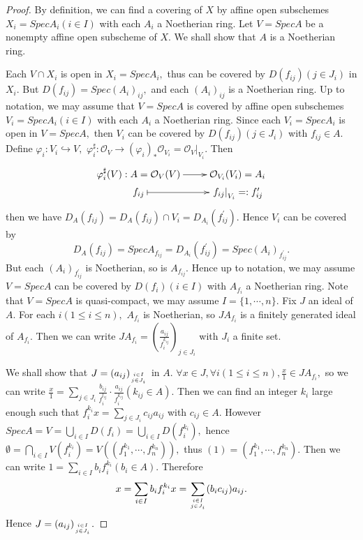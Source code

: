 \begin{proof}
By definition, we can find a covering of $X$ by affine open
subschemes $X_i=SpecA_i(i\in I)$ with each $A_i$ a Noetherian ring.
Let $V=SpecA$ be a nonempty affine open subscheme of $X.$ We shall
show that $A$ is a Noetherian ring.

Each $V\cap X_i$ is open in $X_i=SpecA_i,$ thus can be covered by
$D(f_{ij})(j\in J_i)$ in $X_i.$ But $D(f_{ij})=Spec(A_i)_{ij},$ and
each $(A_i)_{ij}$ is a Noetherian ring. Up to notation, we may
assume that $V=SpecA$ is covered by affine open subschemes
$V_i=SpecA_i(i\in I)$ with each $A_i$ a Noetherian ring. Since each
$V_i=SpecA_i$ is open in $V=SpecA,$ then $V_i$ can be covered by
$D(f_{ij})(j\in J_i)$ with $f_{ij}\in A.$ Define $\varphi_i:
V_i\hookrightarrow V,$ $\varphi_i^{\sharp}:\mathcal {O}_V\rightarrow
(\varphi_i)_{\ast}\mathcal {O}_{V_i}=\left.\mathcal
{O}_V\right|_{V_i}.$ Then
\[ \xymatrix@R=0em{
   {\varphi_i^{\sharp}(V):A=\mathcal {O}_V(V)} \ar[r] & {\mathcal
   {O}_{V_i}(V_i)=A_i}                                            \\
   f_{ij} \ar@{|->}[r] & {\left.f_{ij}\right|_{V_i}=:f_{ij}^{\prime}} }  \]
then we have $D_A(f_{ij})=D_A(f_{ij})\cap
V_i=D_{A_i}(f_{ij}^{\prime}).$ Hence $V_i$ can be covered by
$$D_A(f_{ij})=SpecA_{f_{ij}}=D_{A_i}(f_{ij}^{\prime})=Spec(A_i)_{f_{ij}^{\prime}}.$$
But each $(A_i)_{f_{ij}^{\prime}}$ is Noetherian, so is
$A_{f_{ij}}.$ Hence up to notation, we may assume $V=SpecA$ can be
covered by $D(f_i)(i\in I)$ with $A_{f_i}$ a Noetherian ring. Note
that $V=SpecA$ is quasi-compact, we may assume $I=\{1,\cdots,n\}.$
Fix $J$ an ideal of $A.$ For each $i(1\leqslant i\leqslant n),$
$A_{f_i}$ is Noetherian, so $JA_{f_i}$ is a finitely generated ideal
of $A_{f_i}.$ Then we can write
$JA_{f_i}=(\frac{a_{ij}}{f_i^{k_{ij}}})_{j\in J_i}$ with $J_i$ a
finite set.

We shall show that $J=(a_{ij})_{i\in I \atop j\in J_i}$ in $A.$
$\forall x\in J,\forall i(1\leqslant i\leqslant n), \frac{x}{1}\in
JA_{f_i},$ so we can write $\frac{x}{1}=\sum\limits_{j\in
J_i}\frac{b_{ij}}{f_i^{l_{ij}}}\cdot\frac{a_{ij}}{f_i^{k_{ij}}}(k_{ij}\in
A).$ Then we can find an integer $k_i$ large enough such that
$f_i^{k_i}x=\sum\limits_{j\in J_i}c_{ij}a_{ij}$ with $c_{ij}\in A.$
However $SpecA=V=\bigcup\limits_{i\in I}D(f_i)=\bigcup\limits_{i\in
I}D(f_i^{k_i}),$ hence $\emptyset=\bigcap\limits_{i\in
I}V(f_i^{k_i})=V((f_1^{k_1},\cdots,f_n^{k_n})),$ thus
$(1)=(f_1^{k_1},\cdots,f_n^{k_n}).$ Then we can write
$1=\sum\limits_{i\in I}b_if_i^{k_i}(b_i\in A).$ Therefore
$$x=\sum\limits_{i\in I}b_if_i^{k_i}x=\sum\limits_{i\in I \atop j\in
J_i}(b_ic_{ij})a_{ij}.$$ Hence $J=(a_{ij})_{i\in I \atop j\in J_i}.$
\end{proof}
